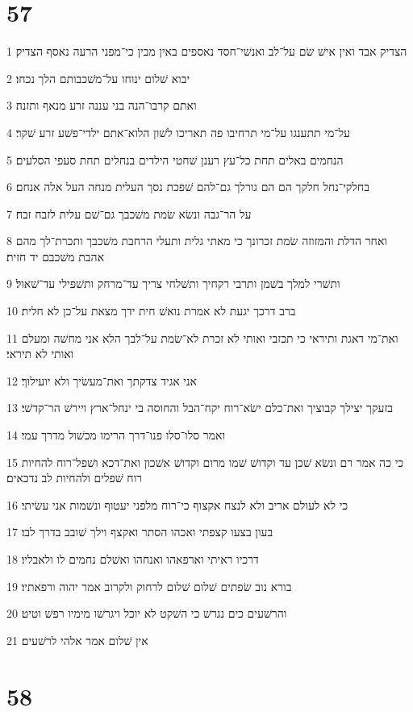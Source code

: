 \chapter{57}

\par 1 הצדיק אבד ואין אישׁ שׂם על־לב ואנשׁי־חסד נאספים באין מבין כי־מפני הרעה נאסף הצדיק׃
\par 2 יבוא שׁלום ינוחו על־משׁכבותם הלך נכחו׃
\par 3 ואתם קרבו־הנה בני עננה זרע מנאף ותזנה׃
\par 4 על־מי תתענגו על־מי תרחיבו פה תאריכו לשׁון הלוא־אתם ילדי־פשׁע זרע שׁקר׃
\par 5 הנחמים באלים תחת כל־עץ רענן שׁחטי הילדים בנחלים תחת סעפי הסלעים׃
\par 6 בחלקי־נחל חלקך הם הם גורלך גם־להם שׁפכת נסך העלית מנחה העל אלה אנחם׃
\par 7 על הר־גבה ונשׂא שׂמת משׁכבך גם־שׁם עלית לזבח זבח׃
\par 8 ואחר הדלת והמזוזה שׂמת זכרונך כי מאתי גלית ותעלי הרחבת משׁכבך ותכרת־לך מהם אהבת משׁכבם יד חזית׃
\par 9 ותשׁרי למלך בשׁמן ותרבי רקחיך ותשׁלחי צריך עד־מרחק ותשׁפילי עד־שׁאול׃
\par 10 ברב דרכך יגעת לא אמרת נואשׁ חית ידך מצאת על־כן לא חלית׃
\par 11 ואת־מי דאגת ותיראי כי תכזבי ואותי לא זכרת לא־שׂמת על־לבך הלא אני מחשׁה ומעלם ואותי לא תיראי׃
\par 12 אני אגיד צדקתך ואת־מעשׂיך ולא יועילוך׃
\par 13 בזעקך יצילך קבוציך ואת־כלם ישׂא־רוח יקח־הבל והחוסה בי ינחל־ארץ ויירשׁ הר־קדשׁי׃
\par 14 ואמר סלו־סלו פנו־דרך הרימו מכשׁול מדרך עמי׃
\par 15 כי כה אמר רם ונשׂא שׁכן עד וקדושׁ שׁמו מרום וקדושׁ אשׁכון ואת־דכא ושׁפל־רוח להחיות רוח שׁפלים ולהחיות לב נדכאים׃
\par 16 כי לא לעולם אריב ולא לנצח אקצוף כי־רוח מלפני יעטוף ונשׁמות אני עשׂיתי׃
\par 17 בעון בצעו קצפתי ואכהו הסתר ואקצף וילך שׁובב בדרך לבו׃
\par 18 דרכיו ראיתי וארפאהו ואנחהו ואשׁלם נחמים לו ולאבליו׃
\par 19 בורא נוב שׂפתים שׁלום שׁלום לרחוק ולקרוב אמר יהוה ורפאתיו׃
\par 20 והרשׁעים כים נגרשׁ כי השׁקט לא יוכל ויגרשׁו מימיו רפשׁ וטיט׃
\par 21 אין שׁלום אמר אלהי לרשׁעים׃

\chapter{58}

